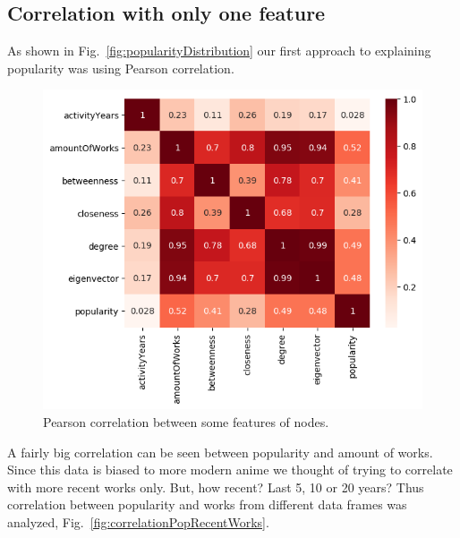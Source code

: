 \subsection{Correlation with only one feature}
As shown in Fig.~\ref{fig:popularityDistribution} our first approach to explaining popularity was using Pearson correlation. 

\begin{figure}[!hbt]
	\begin{center}
	\includegraphics[width=\columnwidth]{graphics/10Works_correlation_Pearson.png}
	\caption{Pearson correlation between some features of nodes.}
	\label{fig:pearsonCorr}
	\end{center}
\end{figure}

A fairly big correlation can be seen between popularity and amount of works. Since this data is biased to more modern anime we thought of trying to correlate with more recent works only. But, how recent? Last 5, 10 or 20 years? Thus correlation between popularity and works from different data frames was analyzed, Fig.~\ref{fig:correlationPopRecentWorks}.

